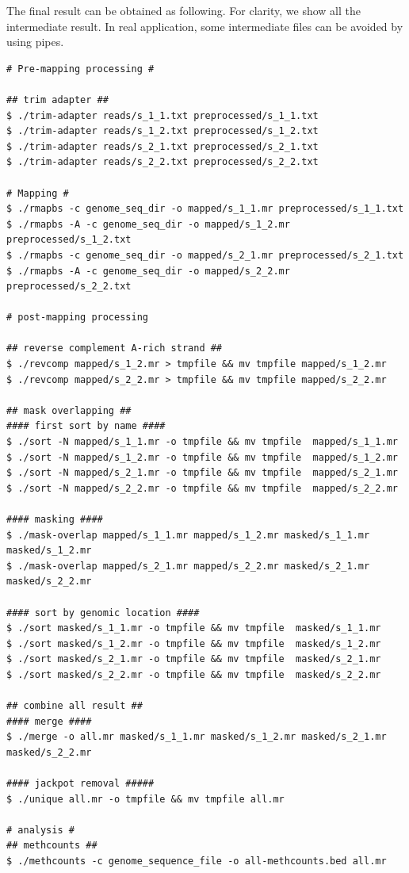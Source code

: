 \documentclass{article}
\begin{document}
The final result can be obtained as following. For clarity, we show
all the intermediate result. In real application, some intermediate
files can be avoided by using pipes.

\begin{verbatim}
# Pre-mapping processing #

## trim adapter ##
$ ./trim-adapter reads/s_1_1.txt preprocessed/s_1_1.txt
$ ./trim-adapter reads/s_1_2.txt preprocessed/s_1_2.txt
$ ./trim-adapter reads/s_2_1.txt preprocessed/s_2_1.txt
$ ./trim-adapter reads/s_2_2.txt preprocessed/s_2_2.txt

# Mapping #
$ ./rmapbs -c genome_seq_dir -o mapped/s_1_1.mr preprocessed/s_1_1.txt
$ ./rmapbs -A -c genome_seq_dir -o mapped/s_1_2.mr preprocessed/s_1_2.txt
$ ./rmapbs -c genome_seq_dir -o mapped/s_2_1.mr preprocessed/s_2_1.txt
$ ./rmapbs -A -c genome_seq_dir -o mapped/s_2_2.mr preprocessed/s_2_2.txt

# post-mapping processing

## reverse complement A-rich strand ##
$ ./revcomp mapped/s_1_2.mr > tmpfile && mv tmpfile mapped/s_1_2.mr
$ ./revcomp mapped/s_2_2.mr > tmpfile && mv tmpfile mapped/s_2_2.mr

## mask overlapping ##
#### first sort by name ####
$ ./sort -N mapped/s_1_1.mr -o tmpfile && mv tmpfile  mapped/s_1_1.mr 
$ ./sort -N mapped/s_1_2.mr -o tmpfile && mv tmpfile  mapped/s_1_2.mr 
$ ./sort -N mapped/s_2_1.mr -o tmpfile && mv tmpfile  mapped/s_2_1.mr 
$ ./sort -N mapped/s_2_2.mr -o tmpfile && mv tmpfile  mapped/s_2_2.mr 

#### masking ####
$ ./mask-overlap mapped/s_1_1.mr mapped/s_1_2.mr masked/s_1_1.mr masked/s_1_2.mr
$ ./mask-overlap mapped/s_2_1.mr mapped/s_2_2.mr masked/s_2_1.mr masked/s_2_2.mr

#### sort by genomic location ####
$ ./sort masked/s_1_1.mr -o tmpfile && mv tmpfile  masked/s_1_1.mr 
$ ./sort masked/s_1_2.mr -o tmpfile && mv tmpfile  masked/s_1_2.mr 
$ ./sort masked/s_2_1.mr -o tmpfile && mv tmpfile  masked/s_2_1.mr 
$ ./sort masked/s_2_2.mr -o tmpfile && mv tmpfile  masked/s_2_2.mr 

## combine all result ##
#### merge ####
$ ./merge -o all.mr masked/s_1_1.mr masked/s_1_2.mr masked/s_2_1.mr masked/s_2_2.mr 

#### jackpot removal #####
$ ./unique all.mr -o tmpfile && mv tmpfile all.mr

# analysis #
## methcounts ##
$ ./methcounts -c genome_sequence_file -o all-methcounts.bed all.mr 
\end{verbatim}
\end{document}
